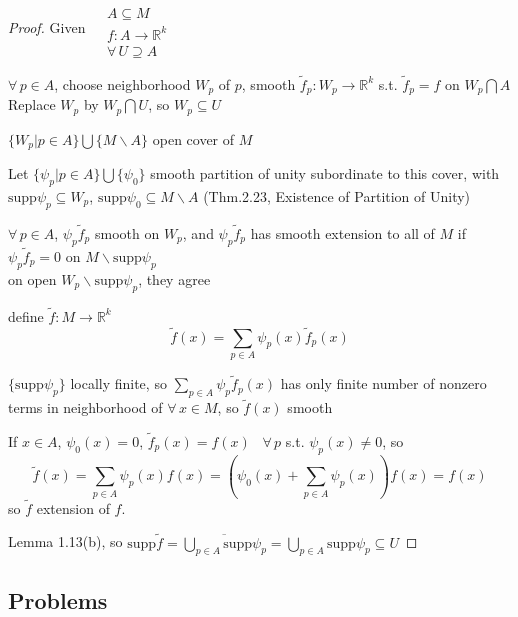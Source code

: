 \begin{proof}
Given $\begin{aligned} & \quad \\ 
  & A \subseteq M \\
  & f: A \to \mathbb{R}^k \\
  & \forall \, U \supseteq A \end{aligned}$

$\forall \, p \in A$, choose neighborhood $W_p$ of $p$, smooth $\widetilde{f}_p:W_p \to \mathbb{R}^k$ s.t. $\widetilde{f}_p = f$ on $W_p \bigcap A$ \\

Replace $W_p $ by $W_p \bigcap U$, so $W_p \subseteq U$

$\lbrace W_p | p \in A \rbrace \bigcup \lbrace M \backslash A\rbrace$ open cover of $M$

Let $\lbrace \psi_p | p \in A\rbrace \bigcup \lbrace \psi_0 \rbrace$ smooth partition of unity subordinate to this cover, with $\text{supp}{\psi_p} \subseteq W_p$, $\text{supp}{\psi_0} \subseteq M\backslash A$ (Thm.2.23, Existence of Partition of Unity)

$\forall \, p \in A$, $\psi_p \widetilde{f}_p$ smooth on $W_p$, and $\psi_p \widetilde{f}_p$ has smooth extension to all of $M$ if $\psi_p \widetilde{f}_p = 0 $ on $M \backslash \text{supp}{\psi_p}$  \\
\quad on open $W_p \backslash \text{supp}{\psi_p}$, they agree

define $\widetilde{f} : M \to \mathbb{R}^k$ 
\[
\widetilde{f}(x) = \sum_{ p \in A} \psi_p(x) \widetilde{f}_p(x)
\]

$\lbrace \text{supp}{ \psi_p} \rbrace$ locally finite, so $\sum_{p \in A} \psi_p \widetilde{f}_p(x)$ has only finite number of nonzero terms in neighborhood of $\forall \, x \in M$, so $\widetilde{f}(x)$ smooth

If $x\in A$, $\psi_0(x) =0$, $\widetilde{f}_p(x)  = f(x)$ \quad \, $\forall \, p $ s.t. $\psi_p(x) \neq 0$, so 
\[
\widetilde{f}(x) = \sum_{p \in A} \psi_p(x) f(x) = (\psi_0(x) + \sum_{p\in A} \psi_p(x) )f(x) = f(x)
\]
so $\widetilde{f}$ extension of $f$.  

Lemma 1.13(b), so $\text{supp}{\widetilde{f}} = \overline{ \bigcup_{p\in A} \text{supp}{\psi_p} } = \bigcup_{p\in A} \text{supp}{\psi_p} \subseteq U$



\end{proof}


\subsection*{ Problems}

